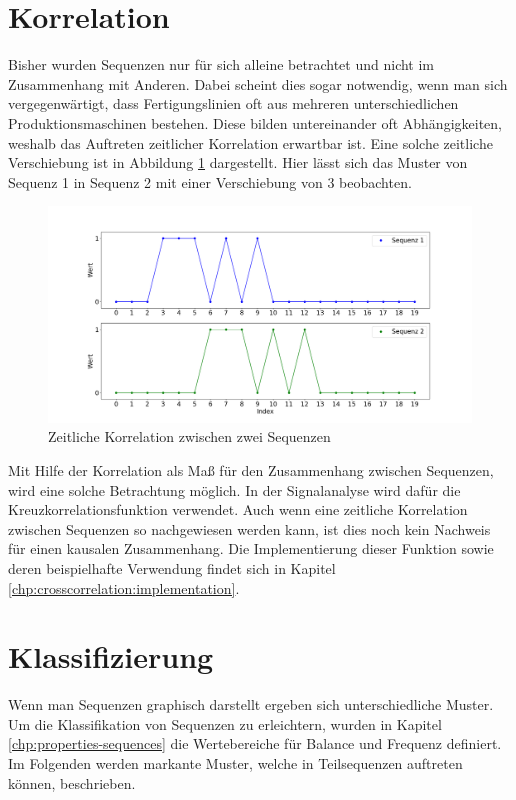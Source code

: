\section{Korrelation}
\label{chp:correlation-sequences}
Bisher wurden Sequenzen nur für sich alleine betrachtet und nicht im Zusammenhang mit Anderen. Dabei scheint dies sogar notwendig, wenn man sich vergegenwärtigt, dass Fertigungslinien oft aus mehreren unterschiedlichen Produktionsmaschinen bestehen. Diese bilden untereinander oft Abhängigkeiten, weshalb das Auftreten zeitlicher Korrelation erwartbar ist. Eine solche zeitliche Verschiebung ist in Abbildung \ref{fig:correlation-sequences-corr} dargestellt. Hier lässt sich das Muster von Sequenz 1 in Sequenz 2 mit einer Verschiebung von 3 beobachten.  

\begin{figure}[H]
	\centering
	\includegraphics[scale=0.32]{images/sequences/correlation}
	\caption{Zeitliche Korrelation zwischen zwei Sequenzen}
	\label{fig:correlation-sequences-corr}
\end{figure}

Mit Hilfe der Korrelation als Maß für den Zusammenhang zwischen Sequenzen, wird eine solche Betrachtung möglich. In der Signalanalyse wird dafür die Kreuzkorrelationsfunktion verwendet. Auch wenn eine zeitliche Korrelation zwischen Sequenzen so nachgewiesen werden kann, ist dies noch kein Nachweis für einen kausalen Zusammenhang. Die Implementierung dieser Funktion sowie deren beispielhafte Verwendung findet sich in Kapitel \ref{chp:crosscorrelation:implementation}.

\section{Klassifizierung}
\label{chp:classification-sequences}
Wenn man Sequenzen graphisch darstellt ergeben sich unterschiedliche Muster. Um die Klassifikation von Sequenzen zu erleichtern, wurden in Kapitel \ref{chp:properties-sequences} die Wertebereiche für Balance und Frequenz definiert. Im Folgenden werden markante Muster, welche in Teilsequenzen auftreten können, beschrieben.

